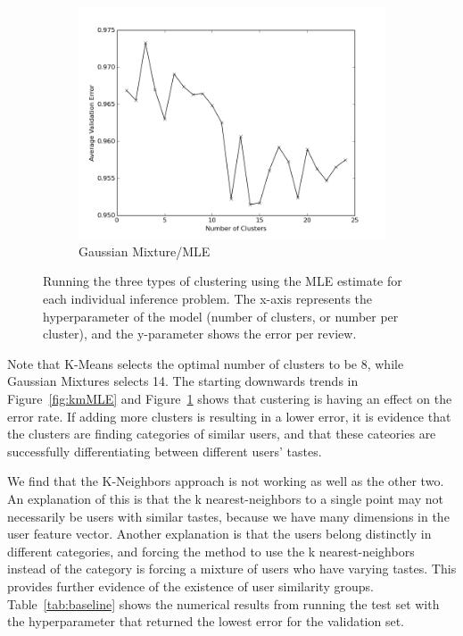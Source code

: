 \documentclass[11pt]{article}
\begin{document}
\begin{figure}[h!]
\begin{subfigure}[h!]{0.33\textwidth}
        \includegraphics[width=\textwidth]{GM_mle.png}
        \caption{Gaussian Mixture/MLE}
        \label{fig:gmMLE}
    \end{subfigure}
    \caption{Running the three types of clustering using the MLE estimate for each individual inference problem. The x-axis represents the hyperparameter of the model (number of clusters, or number per cluster), and the y-parameter shows the error per review.}
    \label{fig:MLE}
\end{figure}

Note that K-Means selects the optimal number of clusters to be 8, while Gaussian Mixtures selects 14. The starting downwards trends in Figure~\ref{fig:kmMLE} and Figure~\ref{fig:gmMLE} shows that custering is having an effect on the error rate. If adding more clusters is resulting in a lower error, it is evidence that the clusters are finding categories of similar users, and that these cateories are successfully differentiating between different users' tastes.

We find that the K-Neighbors approach is not working as well as the other two. An explanation of this is that the k nearest-neighbors to a single point may not necessarily be users with similar tastes, because we have many dimensions in the user feature vector. Another explanation is that the users belong distinctly in different categories, and forcing the method to use the k nearest-neighbors instead of the category is forcing a mixture of users who have varying tastes. This provides further evidence of the existence of user similarity groups. Table~\ref{tab:baseline} shows the numerical results from running the test set with the hyperparameter that returned the lowest error for the validation set.
\end{document}
